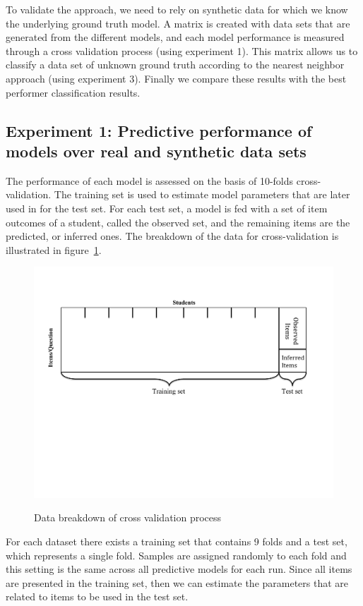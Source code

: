 \begin{enumerate}
\begin{itemize}
To validate the approach, we need to rely on synthetic data for which we know the underlying ground truth model. A matrix is created with data sets that are generated from the different models, and each model performance is measured through a cross validation process (using experiment 1). This matrix allows us to classify a data set of unknown ground truth according to the nearest neighbor approach (using experiment 3). Finally we compare these results with the best performer classification results.

\end{itemize}
\end{enumerate}

\subsection{Experiment 1: Predictive performance of models over real and synthetic data sets}
\label{Exp1:NO}
The performance of each model is assessed on the basis of 10-folds cross-validation. The training set is used to estimate model parameters that are later used in for the test set. For each test set, a model is fed with a set of item outcomes of a student, called the observed set, and the remaining items are the predicted, or inferred ones. The breakdown of the data for cross-validation is illustrated in figure~\ref{figMethod}. 

\begin{figure}[h]
\centering
{\includegraphics[trim=1cm 9cm 2.4cm 2.4cm,clip=true,width=.7\textwidth]{images/Methodology.pdf}}
\caption{Data breakdown of cross validation process}
\label{figMethod}
\end{figure}


For each dataset there exists a training set that contains 9 folds and a test set, which represents a single fold. Samples are assigned randomly to each fold and this setting is the same across all predictive models for each run. Since all items are presented in the training set, then we can estimate the parameters that are related to items to be used in the test set. 

